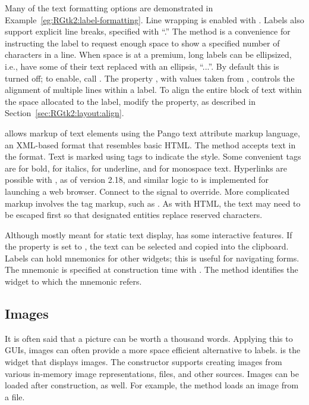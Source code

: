 Many of the text formatting options are demonstrated in
Example~\ref{eg:RGtk2:label-formatting}. Line wrapping is enabled with
. Labels also support explicit line
breaks, specified with ``\code{\backslashn}.'' The
 method is a convenience for instructing the
label to request enough space to show a specified number of
characters in a line.  When space is at a premium, long labels can be
ellipsized, i.e., have some of their text replaced with an
ellipsis, ``...''.  By default this is turned off; to enable, call
.  The property , with
values taken from , controls the alignment of
multiple lines within a label. To align the entire block of text
within the space allocated to the label, modify the 
property, as described in Section~\ref{sec:RGtk2:layout:align}.

\GTK\/ allows markup of text elements using the Pango text attribute
markup language, an XML-based format that resembles basic HTML. The
method  accepts text in the format. Text
is marked using tags to indicate the style. Some convenient tags are
 for bold,  for italics,  for
underline, and  for monospace text. Hyperlinks are possible
with , as of version 2.18, and similar logic to
 is implemented for launching a web
browser. Connect to the  signal to
override. More complicated markup involves the  tag
markup, such as . As with
HTML, the text may need to be escaped first so that designated
entities replace reserved characters.

Although mostly meant for static text display,  has
some interactive features. If the  property is set to
, the text can be selected and copied into the clipboard.
Labels can hold mnemonics for other widgets; this is useful for
navigating forms. The mnemonic is specified at construction time with
. The
 method identifies the widget to
which the mnemonic refers.

\subsection{Images}
\label{sec:RGtk2:images}

It is often said that a picture can be worth a thousand
words. Applying this to GUIs, images can often provide a more space
efficient alternative to labels.  is the widget that
displays images. The constructor  supports
creating images from various in-memory image representations, files,
and other sources.  Images can be loaded after construction, as well. For example,
the  method loads an image from a file.

